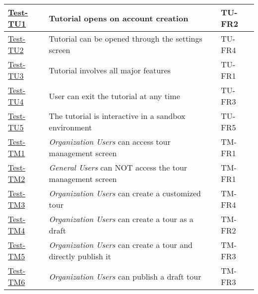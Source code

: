 \documentclass[12pt, titlepage]{article}
\begin{document}
\begin{table}[htpb!]
  \centering
  \begin{tabular}{|l|p{8cm}|p{3cm}|}
    \hline
    \hyperref[itm:Test-TU1]{Test-TU1} & Tutorial opens on account creation                                                                                    & TU-FR2   \\
    \hline
    \hyperref[itm:Test-TU2]{Test-TU2} & Tutorial can be opened through the settings screen                                                                    & TU-FR4   \\
    \hline
    \hyperref[itm:Test-TU3]{Test-TU3} & Tutorial involves all major features                                                                                  & TU-FR1   \\
    \hline
    \hyperref[itm:Test-TU4]{Test-TU4} & User can exit the tutorial at any time                                                                                & TU-FR3   \\
    \hline
    \hyperref[itm:Test-TU5]{Test-TU5} & The tutorial is interactive in a sandbox environment                                                                  & TU-FR5   \\
    \hline
    \hyperref[itm:Test-TM1]{Test-TM1} & \textit{Organization Users} can access tour management screen                                                         & TM-FR1   \\
    \hline
    \hyperref[itm:Test-TM2]{Test-TM2} & \textit{General Users} can NOT access the tour management screen                                                      & TM-FR1   \\
    \hline
    \hyperref[itm:Test-TM3]{Test-TM3} & \textit{Organization Users} can create a customized tour                                                              & TM-FR4   \\
    \hline
    \hyperref[itm:Test-TM4]{Test-TM4} & \textit{Organization Users} can create a tour as a draft                                                              & TM-FR2   \\
    \hline
    \hyperref[itm:Test-TM5]{Test-TM5} & \textit{Organization Users} can create a tour and directly publish it                                                 & TM-FR3   \\
    \hline
    \hyperref[itm:Test-TM6]{Test-TM6} & \textit{Organization Users} can publish a draft tour                                                                  & TM-FR3   \\

\end{tabular}
\end{table}
\end{document}
